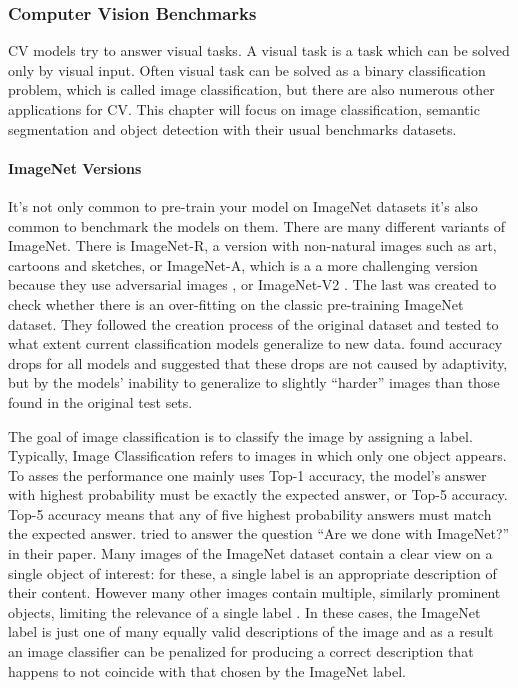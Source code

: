 \documentclass[
]{krantz}
\begin{document}
\hypertarget{computer-vision-benchmarks}{%
\subsubsection{Computer Vision Benchmarks}\label{computer-vision-benchmarks}}

CV models try to answer visual tasks. A visual task is a task which can be solved only by visual input. Often visual task can be solved as a binary classification problem, which is called image classification, but there are also numerous other applications for CV. This chapter will focus on image classification, semantic segmentation and object detection with their usual benchmarks datasets.

\hypertarget{imagenet-versions}{%
\paragraph{ImageNet Versions}\label{imagenet-versions}}

It's not only common to pre-train your model on ImageNet datasets it's also common to benchmark the models on them. There are many different variants of ImageNet. There is ImageNet-R, a version with non-natural images such as art, cartoons and sketches, or ImageNet-A, which is a a more challenging version because they use adversarial images \citep{goodfellow2014explaining}, or ImageNet-V2 \citep{recht2019imagenet}. The last was created to check whether there is an over-fitting on the classic pre-training ImageNet dataset. They followed the creation process of the original dataset and tested to what extent current classification models generalize to new data. \citet{recht2019imagenet} found accuracy drops for all models and suggested that these drops are not caused by adaptivity, but by the models' inability to generalize to slightly ``harder'' images than those found in the original test sets.

The goal of image classification is to classify the image by assigning a label. Typically, Image Classification refers to images in which only one object appears. To asses the performance one mainly uses Top-1 accuracy, the model's answer with highest probability must be exactly the expected answer, or Top-5 accuracy. Top-5 accuracy means that any of five highest probability answers must match the expected answer. \citet{beyer2020we} tried to answer the question ``Are we done with ImageNet?'' in their paper. Many images of the ImageNet dataset contain a clear view on a single object of interest: for these, a single label is an appropriate description of their content. However many other images contain multiple, similarly prominent objects, limiting the relevance of a single label \citep{beyer2020we}. In these cases, the ImageNet label is just one of many equally valid descriptions of the image and as a result an image classifier can be penalized for producing a correct description that happens to not coincide with that chosen by the ImageNet label.
\end{document}
